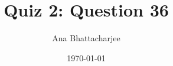 \documentclass{article}
\begin{document}
\author{Ana Bhattacharjee}
\title{Quiz 2: Question 36}
\date{\today}
\maketitle{}
\end{document}
